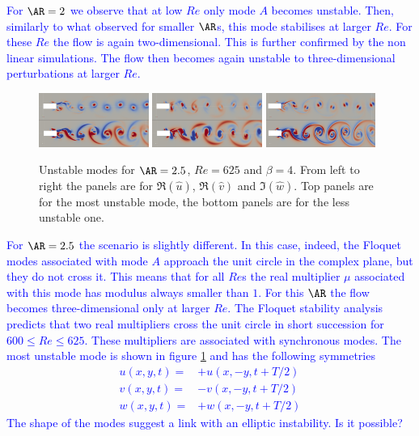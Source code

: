 \textcolor{blue}{
For $\AR=2$ we observe that at low $Re$ only mode $A$ becomes unstable. Then, similarly to what observed for smaller $\AR$s, this mode stabilises at larger $Re$. For these $Re$ the flow is again two-dimensional. This is further confirmed by the non linear simulations. The flow then becomes again unstable to three-dimensional perturbations at larger $Re$.
}
\begin{figure}
  \centering
  \includegraphics[width=0.32\textwidth]{./fig/AR2p5/u_Re625_beta4.png}
  \includegraphics[width=0.32\textwidth]{./fig/AR2p5/v_Re625_beta4.png}
  \includegraphics[width=0.32\textwidth]{./fig/AR2p5/w_Re625_beta4.png} 
  \caption{Unstable modes for $\AR=2.5$, $Re=625$ and $\beta=4$. From left to right the panels are for $\Re(\hat{u})$, $\Re(\hat{v})$ and $\Im(\hat{w})$. Top panels are for the most unstable mode, the bottom panels are for the less unstable one.}
  \label{fig:AR2p5modes}   
\end{figure}
\textcolor{blue}{
For $\AR=2.5$ the scenario is slightly different. In this case, indeed, the Floquet modes associated with mode $A$ approach the unit circle in the complex plane, but they do not cross it. This means that for all $Re$s the real multiplier $\mu$ associated with this mode has modulus always smaller than $1$. For this $\AR$ the flow becomes three-dimensional only at larger $Re$. The Floquet stability analysis predicts that two real multipliers cross the unit circle in short succession for $600 \le Re \le 625$. These multipliers are associated with synchronous modes.
The most unstable mode is shown in figure \ref{fig:AR2p5modes} and has the following symmetries
\begin{equation}
  \begin{aligned}
    u(x,y,t) = &+ u(x,-y,t+T/2) \\
    v(x,y,t) = &- v(x,-y,t+T/2) \\
    w(x,y,t) = &+ w(x,-y,t+T/2) 
  \end{aligned}
\end{equation}
The shape of the modes suggest a link with an elliptic instability. Is it possible?
}

